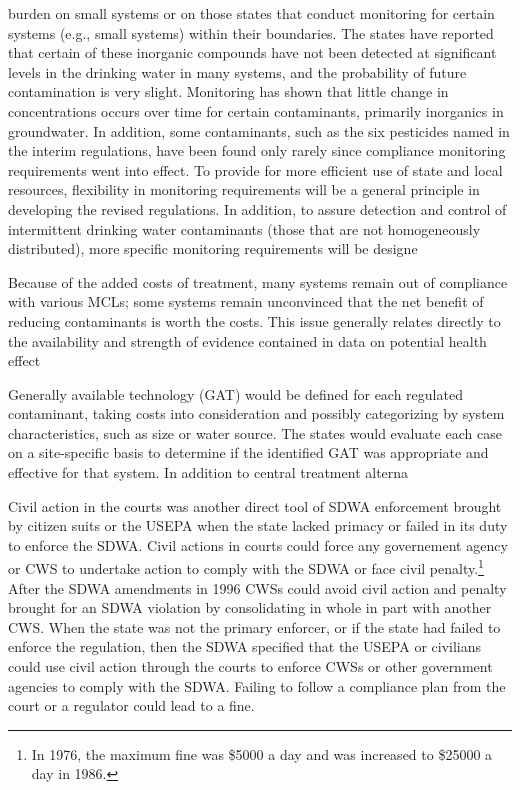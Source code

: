 \documentclass{article}
\begin{document}
burden on small systems or on those
states that conduct monitoring for certain systems (e.g., small systems) within
their boundaries. The states have reported that certain of these inorganic
compounds have not been detected at
significant levels in the drinking water
in many systems, and the probability of
future contamination is very slight.
Monitoring has shown that little change
in concentrations occurs over time for
certain contaminants, primarily inorganics in groundwater. In addition, some
contaminants, such as the six pesticides
named in the interim regulations, have
been found only rarely since compliance
monitoring requirements went into
effect.
To provide for more efficient use of
state and local resources, flexibility in
monitoring requirements will be a general principle in developing the revised
regulations. In addition, to assure detection and control of intermittent drinking
water contaminants (those that are not
homogeneously distributed), more specific monitoring requirements will be
designe

Because of the added costs of
treatment, many systems remain out of
compliance with various MCLs; some
systems remain unconvinced that the
net benefit of reducing contaminants is
worth the costs. This issue generally
relates directly to the availability and
strength of evidence contained in data
on potential health effect

Generally available technology (GAT)
would be defined for each regulated
contaminant, taking costs into consideration and possibly categorizing by
system characteristics, such as size or
water source. The states would evaluate
each case on a site-specific basis to
determine if the identified GAT was
appropriate and effective for that system.
In addition to central treatment alterna

Civil action in the courts was another direct tool of SDWA enforcement brought by citizen suits or the USEPA when the state lacked primacy or failed in its duty to enforce the SDWA. Civil actions in courts could force any governement agency or CWS to undertake action to comply with the SDWA or face civil penalty.\footnote{In 1976, the maximum fine was \$5000 a day and was increased to \$25000 a day in 1986.} After the SDWA amendments in 1996 CWSs could avoid civil action and penalty brought for an SDWA violation by consolidating in whole in part with another CWS. When the state was not the primary enforcer, or if the state had failed to enforce the regulation, then the SDWA specified that the USEPA or civilians could use civil action through the courts to enforce CWSs or other government agencies to comply with the SDWA. Failing to follow a compliance plan from the court or a regulator could lead to a fine.
\end{document}
